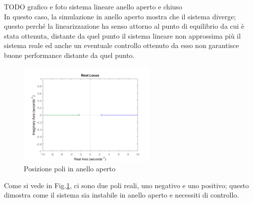 TODO grafico e foto sistema lineare anello aperto e chiuso
\\
In questo caso, la simulazione in anello aperto mostra che il sistema diverge; questo perché la linearizzazione ha senso attorno al punto di equilibrio da cui è stata ottenuta, distante da quel punto il sistema lineare non approssima più il sistema reale ed anche un eventuale controllo ottenuto da esso non garantisce buone performance distante da quel punto.
\begin{figure}[H]
	\centering   	
	\includegraphics[width=0.6\textwidth]{Immagini/root_locus_open_loop.png}
	\caption{Posizione poli in anello aperto}
	\label{fig:open_loop_root}
\end{figure}
Come si vede in Fig.\ref{fig:open_loop_root}, ci sono due poli reali, uno negativo e uno positivo; questo dimostra come il sistema sia instabile in anello aperto e necessiti di controllo.


